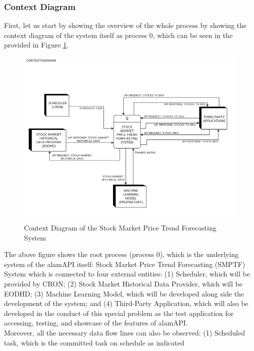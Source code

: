 \subsubsection{Context Diagram}
\label{subsubsec:context_dfd}
First, let us start by showing the overview of 
the whole process by showing the context diagram of the system itself as 
process 0, which can be seen in the provided in Figure \ref{fig:context_dfd}.
\begin{figure}[ht]
    \centering
    \includegraphics[width=1\textwidth]{./assets/Data Flow Diagram-01.png}
    \caption{Context Diagram of the Stock Market Price Trend Forecasting System}
    \label{fig:context_dfd}
\end{figure}
\FloatBarrier
\vspace{0.5cm}
The above figure shows the root process (process 0), which is the underlying 
system of the alamAPI itself: Stock Market Price Trend Forecasting (SMPTF) 
System which is connected to four external entities: (1) Scheduler, 
which will be provided by CRON; (2) Stock Market Historical Data Provider, 
which will be EODHD; (3) Machine Learning Model, which will be developed 
along side the development of the system; and (4) Third-Party Application, 
which will also be developed in the conduct of this special problem as the 
test application for accessing, testing, and showcase of the features of alamAPI.
\vspace{0.5cm}
\\Moreover, all the necessary data flow lines can also be observed: 
(1) Scheduled task, which is the committed task on schedule as indicated 
